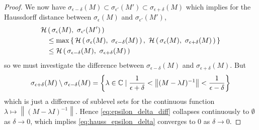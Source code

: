 \begin{proof}
    We now have 
    $\sigma_{\epsilon - \delta} (M) 
    \subset \sigma_{\epsilon'} (M') 
    \subset \sigma_{\epsilon + \delta} (M)$
    which implies for the Haussdorff distance between $\sigma_\epsilon (M)$ and 
    $\sigma_{\epsilon'} (M')$,
    \begin{align}
        \scrH & \left(\, \sigma_\epsilon (M),\ \sigma_{\epsilon'} (M') \,\right) \\
        & \leq \max \left\{\,
            \scrH \left(\, \sigma_\epsilon (M),\ \sigma_{\epsilon - \delta} (M) \,\right),\ 
            \scrH \left(\, \sigma_\epsilon (M),\ \sigma_{\epsilon + \delta} (M) \,\right) 
        \,\right\} \\
        & \leq \scrH \left(\, 
            \sigma_{\epsilon - \delta} (M),\ 
            \sigma_{\epsilon + \delta} (M) 
        \,\right) \label{eq:hauss_epsilon_delta}
    \end{align}
    so we must investigate the difference between $\sigma_{\epsilon - \delta} (M)$ and 
    $\sigma_{\epsilon + \delta} (M)$. But 
    \begin{equation}
        \label{eq:epsilon_delta_diff}
        \sigma_{\epsilon + \delta} (M) \setminus \sigma_{\epsilon - \delta} (M) 
        = \left\{ \lambda \in \mathbb{C} \mid 
            \frac{1}{\epsilon + \delta}
            < \left\| (M - \lambda I)^{-1} \right\| 
            < \frac{1}{\epsilon - \delta}
        \right\}
    \end{equation}
    which is just a difference of sublevel sets for the continuous function 
    $\lambda \mapsto \left\| (M - \lambda I)^{-1} \right\|$. Hence 
    \ref{eq:epsilon_delta_diff} collapses continuously to $\emptyset$ as $\delta \to 0$, 
    which implies \ref{eq:hauss_epsilon_delta} converges to $0$ as $\delta \to 0$. 
\end{proof}


